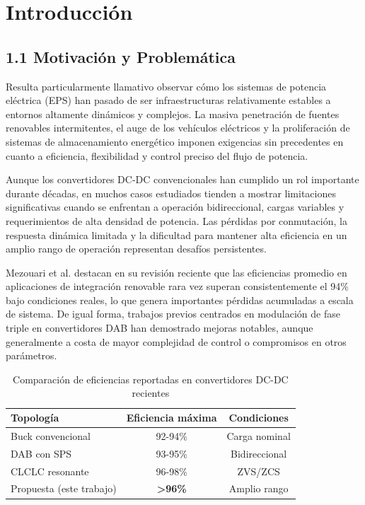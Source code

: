 \section{Introducción}

\subsection{1.1 Motivación y Problemática}

Resulta particularmente llamativo observar cómo los sistemas de potencia eléctrica (EPS) han pasado de ser infraestructuras relativamente estables a entornos altamente dinámicos y complejos. La masiva penetración de fuentes renovables intermitentes, el auge de los vehículos eléctricos y la proliferación de sistemas de almacenamiento energético imponen exigencias sin precedentes en cuanto a eficiencia, flexibilidad y control preciso del flujo de potencia.

Aunque los convertidores DC-DC convencionales han cumplido un rol importante durante décadas, en muchos casos estudiados tienden a mostrar limitaciones significativas cuando se enfrentan a operación bidireccional, cargas variables y requerimientos de alta densidad de potencia. Las pérdidas por conmutación, la respuesta dinámica limitada y la dificultad para mantener alta eficiencia en un amplio rango de operación representan desafíos persistentes. 

Mezouari et al. \cite{Mezouari2025} destacan en su revisión reciente que las eficiencias promedio en aplicaciones de integración renovable rara vez superan consistentemente el 94\% bajo condiciones reales, lo que genera importantes pérdidas acumuladas a escala de sistema. De igual forma, trabajos previos centrados en modulación de fase triple en convertidores DAB \cite{Ren2022} han demostrado mejoras notables, aunque generalmente a costa de mayor complejidad de control o compromisos en otros parámetros.

\begin{table}[h]
\centering
\caption{Comparación de eficiencias reportadas en convertidores DC-DC recientes}
\label{tab:eficiencias}
\begin{tabular}{lcc}
\hline
Topología & Eficiencia máxima & Condiciones \\
\hline
Buck convencional & 92-94\% & Carga nominal \\
DAB con SPS & 93-95\% & Bidireccional \\
CLCLC resonante & 96-98\% & ZVS/ZCS \\
Propuesta (este trabajo) & \textbf{>96\%} & Amplio rango \\
\hline
\end{tabular}
\end{table}

